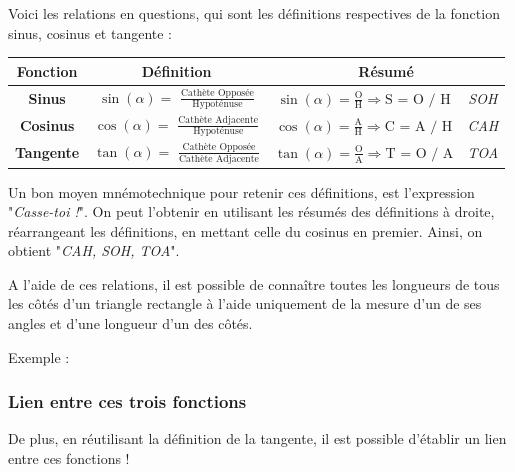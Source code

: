 \documentclass[a4paper]{article}
\begin{document}
\newpage

			{\noindent Voici les relations en questions, qui sont les définitions respectives de la fonction sinus, cosinus et tangente : }
			
			\begin{center}
				
				\renewcommand{\arraystretch}{1.75}
				\begin{tabular}{|c|ccc|}
					\hline
					\textbf{Fonction} & \textbf{Définition}                                                      & \multicolumn{2}{c|}{\textbf{Résumé}} \\
					\hline
					\textbf{Sinus}    & $\sin(\alpha) =$ {\large $\frac{\text{Cathète Opposée}}{\text{Hypoténuse}}$       } & $\sin(\alpha) = \frac{\text{O}}{\text{H}} \Longrightarrow \text{S = O / H} $ & \textit{SOH} \\
					\textbf{Cosinus}  & $\cos(\alpha) =$ {\large $\frac{\text{Cathète Adjacente}}{\text{Hypoténuse}}$     } & $\cos(\alpha) = \frac{\text{A}}{\text{H}} \Longrightarrow \text{C = A / H} $ & \textit{CAH} \\
					\textbf{Tangente} & $\tan(\alpha) =$ {\large $\frac{\text{Cathète Opposée}}{\text{Cathète Adjacente}}$} & $\tan(\alpha) = \frac{\text{O}}{\text{A}} \Longrightarrow \text{T = O / A} $ & \textit{TOA} \\
					\hline
				\end{tabular}
			\end{center}

			Un bon moyen mnémotechnique pour retenir ces définitions, 
			est l'expression "\textit{Casse-toi !}". 
			On peut l'obtenir en utilisant les résumés des définitions à droite, 
			réarrangeant les définitions, en mettant celle du cosinus en premier.
			Ainsi, on obtient "\textit{CAH, SOH, TOA}".
			
			\medbreak

			A l'aide de ces relations, 
			il est possible de connaître toutes les longueurs de 
			tous les côtés d'un triangle rectangle à l'aide uniquement 
			de la mesure d'un de ses angles et d'une longueur d'un des côtés.

			Exemple :


		\subsubsection{Lien entre ces trois fonctions}

			De plus, en réutilisant la définition de la tangente, il est possible d'établir un lien entre ces fonctions !
\end{document}
